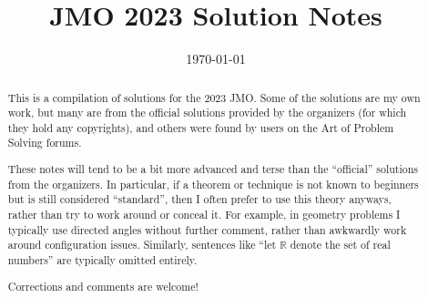 \documentclass[11pt]{scrartcl}
\title{JMO 2023 Solution Notes}
\date{\today}
\begin{document}
\maketitle

\begin{abstract}
This is a compilation of solutions
for the 2023 JMO.
Some of the solutions are my own work,
but many are from the official solutions provided by the organizers
(for which they hold any copyrights),
and others were found by users on the Art of Problem Solving forums.

These notes will tend to be a bit more advanced and terse than the ``official''
solutions from the organizers.
In particular, if a theorem or technique is not known to beginners
but is still considered ``standard'', then I often prefer to
use this theory anyways, rather than try to work around or conceal it.
For example, in geometry problems I typically use directed angles
without further comment, rather than awkwardly work around configuration issues.
Similarly, sentences like ``let $\mathbb{R}$ denote the set of real numbers''
are typically omitted entirely.

Corrections and comments are welcome!
\end{abstract}

\tableofcontents
\newpage

\addtocounter{section}{-1}
\end{document}
